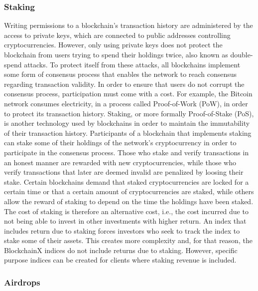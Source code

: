 \documentclass{article}
\begin{document}
\subsubsection{Staking}\label{staking}

Writing permissions to a blockchain's transaction history are
administered by the access to private keys, which are connected to
public addresses controlling cryptocurrencies. However, only using
private keys does not protect the blockchain from users trying to spend
their holdings twice, also known as double-spend attacks. To protect
itself from these attacks, all blockchains implement some form of
consensus process that enables the network to reach consensus regarding
transaction validity. In order to ensure that users do not corrupt the
consensus process, participation must come with a cost. For example, the
Bitcoin network consumes electricity, in a process called Proof-of-Work
(PoW), in order to protect its transaction history. Staking, or more
formally Proof-of-Stake (PoS), is another technology used by blockchains
in order to maintain the immutability of their transaction history.
Participants of a blockchain that implements staking can stake some of
their holdings of the network's cryptocurrency in order to participate
in the consensus process. Those who stake and verify transactions in an
honest manner are rewarded with new cryptocurrencies, while those who
verify transactions that later are deemed invalid are penalized by
loosing their stake. Certain blockchains demand that staked
cryptocurrencies are locked for a certain time or that a certain amount
of cryptocurrencies are staked, while others allow the reward of staking
to depend on the time the holdings have been staked. The cost of staking
is therefore an alternative cost, i.e., the cost incurred due to not
being able to invest in other investments with higher return. An index
that includes return due to staking forces investors who seek to track
the index to stake some of their assets. This creates more complexity
and, for that reason, the BlockchainX indices do not include returns due
to staking. However, specific purpose indices can be created for clients
where staking revenue is included.

\subsubsection{Airdrops}\label{airdrops}
\end{document}
